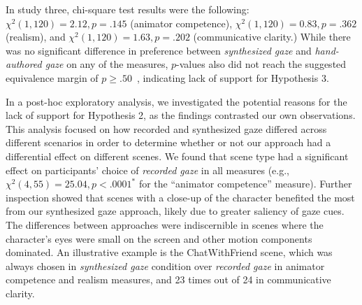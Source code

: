 In study three, chi-square test results were the following: $\chi^2(1, 120) = 2.12, p = .145$ (animator competence), $\chi^2(1, 120) = 0.83, p = .362$ (realism), and $\chi^2(1, 120) = 1.63, p = .202$ (communicative clarity.) While there was no significant difference in preference between \emph{synthesized gaze} and \emph{hand-authored gaze} on any of the measures, $p$-values also did not reach the suggested equivalence margin of $p \geq .50$~\cite{walker2011equivalence}, indicating lack of support for Hypothesis 3.

In a post-hoc exploratory analysis, we investigated the potential reasons for the lack of support for Hypothesis 2, as the findings contrasted our own observations. This analysis focused on how recorded and synthesized gaze differed across different scenarios in order to determine whether or not our approach had a differential effect on different scenes. We found that scene type had a significant effect on participants' choice of \emph{recorded gaze} in all measures (e.g., $\chi^2(4, 55) = 25.04, p < .0001^*$ for the ``animator competence'' measure). Further inspection showed that scenes with a close-up of the character benefited the most from our synthesized gaze approach, likely due to greater saliency of gaze cues. The differences between approaches were indiscernible in scenes where the character's eyes were small on the screen and other motion components dominated. An illustrative example is the ChatWithFriend scene, which was always chosen in \emph{synthesized gaze} condition over \emph{recorded gaze} in animator competence and realism measures, and 23 times out of 24 in communicative clarity.

